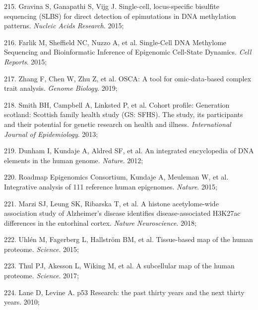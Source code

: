\documentclass[11pt,oneside]{bristolthesis}
\newenvironment{cslreferences}%
  {}%
  {\par}
\begin{document}
\begin{cslreferences}
\leavevmode\hypertarget{ref-Gravina2015}{}%
215. Gravina S, Ganapathi S, Vijg J. Single-cell, locus-specific bisulfite sequencing (SLBS) for direct detection of epimutations in DNA methylation patterns. \emph{Nucleic Acids Research}. 2015;

\leavevmode\hypertarget{ref-Farlik2015}{}%
216. Farlik M, Sheffield NC, Nuzzo A, et al. Single-Cell DNA Methylome Sequencing and Bioinformatic Inference of Epigenomic Cell-State Dynamics. \emph{Cell Reports}. 2015;

\leavevmode\hypertarget{ref-Zhang2019}{}%
217. Zhang F, Chen W, Zhu Z, et al. OSCA: A tool for omic-data-based complex trait analysis. \emph{Genome Biology}. 2019;

\leavevmode\hypertarget{ref-Smith2013}{}%
218. Smith BH, Campbell A, Linksted P, et al. Cohort profile: Generation scotland: Scottish family health study (GS: SFHS). The study, its participants and their potential for genetic research on health and illness. \emph{International Journal of Epidemiology}. 2013;

\leavevmode\hypertarget{ref-Dunham2012}{}%
219. Dunham I, Kundaje A, Aldred SF, et al. An integrated encyclopedia of DNA elements in the human genome. \emph{Nature}. 2012;

\leavevmode\hypertarget{ref-RoadmapEpigenomicsConsortium2015}{}%
220. Roadmap Epigenomics Consortium, Kundaje A, Meuleman W, et al. Integrative analysis of 111 reference human epigenomes. \emph{Nature}. 2015;

\leavevmode\hypertarget{ref-Marzi2018}{}%
221. Marzi SJ, Leung SK, Ribarska T, et al. A histone acetylome-wide association study of Alzheimer's disease identifies disease-associated H3K27ac differences in the entorhinal cortex. \emph{Nature Neuroscience}. 2018;

\leavevmode\hypertarget{ref-Uhlen2015}{}%
222. Uhlén M, Fagerberg L, Hallström BM, et al. Tissue-based map of the human proteome. \emph{Science}. 2015;

\leavevmode\hypertarget{ref-Thul2017}{}%
223. Thul PJ, Akesson L, Wiking M, et al. A subcellular map of the human proteome. \emph{Science}. 2017;

\leavevmode\hypertarget{ref-Lane2010}{}%
224. Lane D, Levine A. p53 Research: the past thirty years and the next thirty years. 2010;
\end{cslreferences}
\end{document}
